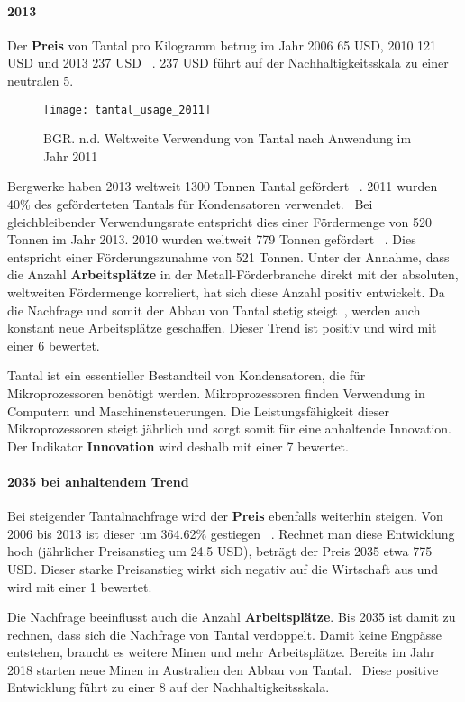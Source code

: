 \paragraph{2013}
Der \textbf{Preis} von Tantal pro Kilogramm betrug im Jahr 2006 65 USD, 2010 121 USD und 2013 237 USD ~\cite{tantal_price2}. 237 USD führt auf der Nachhaltigkeitsskala zu einer neutralen 5.

\begin{figure}[h]
\centering
\texttt{[image: tantal\_usage\_2011]}
\caption{BGR. n.d. Weltweite Verwendung von Tantal nach Anwendung im Jahr 2011 ~\cite{tantal_usage}}
\label{}
\end{figure}

Bergwerke haben 2013 weltweit 1300 Tonnen Tantal gefördert ~\cite{tantal_price2}. 2011 wurden 40\% des geförderteten Tantals für Kondensatoren verwendet.~\cite{tantal_usage} Bei gleichbleibender Verwendungsrate entspricht dies einer Fördermenge von 520 Tonnen im Jahr 2013. 2010 wurden weltweit 779 Tonnen gefördert ~\cite{tantal_price2}. Dies entspricht einer Förderungszunahme von 521 Tonnen. Unter der Annahme, dass die Anzahl \textbf{Arbeitsplätze} in der Metall-Förderbranche direkt mit der absoluten, weltweiten Fördermenge korreliert, hat sich diese Anzahl positiv entwickelt. 
Da die Nachfrage und somit der Abbau von Tantal stetig steigt~\cite{tantal_price2}, werden auch konstant neue Arbeitsplätze geschaffen. Dieser Trend ist positiv und wird mit einer 6 bewertet.

Tantal ist ein essentieller Bestandteil von Kondensatoren, die für Mikroprozessoren benötigt werden. Mikroprozessoren finden Verwendung in Computern und Maschinensteuerungen. Die Leistungsfähigkeit dieser Mikroprozessoren steigt jährlich und sorgt somit für eine anhaltende Innovation. Der Indikator \textbf{Innovation} wird deshalb mit einer 7 bewertet.

\paragraph{2035 bei anhaltendem Trend}
Bei steigender Tantalnachfrage wird der \textbf{Preis} ebenfalls weiterhin steigen. Von 2006 bis 2013 ist dieser um 364.62\% gestiegen ~\cite{tantal_price2}. Rechnet man diese Entwicklung hoch (jährlicher Preisanstieg um 24.5 USD), beträgt der Preis 2035 etwa 775 USD. Dieser starke Preisanstieg wirkt sich negativ auf die Wirtschaft aus und wird mit einer 1 bewertet.

Die Nachfrage beeinflusst auch die Anzahl \textbf{Arbeitsplätze}. Bis 2035 ist damit zu rechnen, dass sich die Nachfrage von Tantal verdoppelt. Damit keine Engpässe entstehen, braucht es weitere Minen und mehr Arbeitsplätze. Bereits im Jahr 2018 starten neue Minen in Australien den Abbau von Tantal.~\cite{new_mine_aus} Diese positive Entwicklung führt zu einer 8 auf der Nachhaltigkeitsskala.


